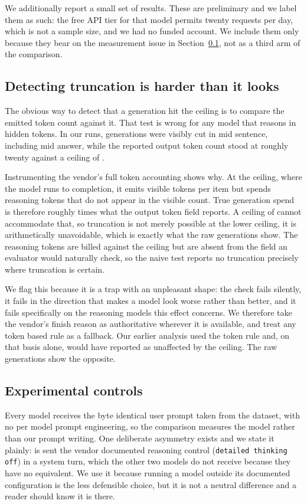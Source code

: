 \documentclass[10pt,twocolumn]{article}
\begin{document}
We additionally report a small set of \geminiName{} results. These are
preliminary and we label them as such: the free API tier for that model permits
twenty requests per day, which is not a sample size, and we had no funded
account. We include them only because they bear on the measurement issue in
Section~\ref{sec:hidden}, not as a third arm of the comparison.

\subsection{Detecting truncation is harder than it looks}
\label{sec:hidden}
The obvious way to detect that a generation hit the ceiling is to compare the
emitted token count against it. That test is wrong for any model that reasons
in hidden tokens. In our \geminiName{} runs, generations were visibly cut in
mid sentence, including mid answer, while the reported output token count stood
at roughly twenty against a ceiling of \tokenLowBudget{}.

Instrumenting the vendor's full token accounting shows why. At the
\tokenHighBudget{} ceiling, where the model runs to completion, it emits
\geminiVisibleTokens{} visible tokens per item but spends
\geminiThinkingTokens{} reasoning tokens that do not appear in the visible
count. True generation spend is therefore roughly \geminiSpendRatio{} times what
the output token field reports. A ceiling of \tokenLowBudget{} cannot
accommodate that, so truncation is not merely possible at the lower ceiling, it
is arithmetically unavoidable, which is exactly what the raw generations show.
The reasoning tokens are billed against the ceiling but are absent from the
field an evaluator would naturally check, so the naive test reports no
truncation precisely where truncation is certain.

We flag this because it is a trap with an unpleasant shape: the check fails
silently, it fails in the direction that makes a model look worse rather than
better, and it fails specifically on the reasoning models this effect concerns.
We therefore take the vendor's finish reason as authoritative wherever it is
available, and treat any token based rule as a fallback. Our earlier analysis
used the token rule and, on that basis alone, would have reported \geminiName{}
as unaffected by the ceiling. The raw generations show the opposite.

\subsection{Experimental controls}
Every model receives the byte identical user prompt taken from the dataset, with
no per model prompt engineering, so the comparison measures the model rather
than our prompt writing. One deliberate asymmetry exists and we state it
plainly: \nemotronName{} is sent the vendor documented reasoning control
(\texttt{detailed thinking off}) in a system turn, which the other two models do
not receive because they have no equivalent. We use it because running a model
outside its documented configuration is the less defensible choice, but it is
not a neutral difference and a reader should know it is there.
\end{document}
